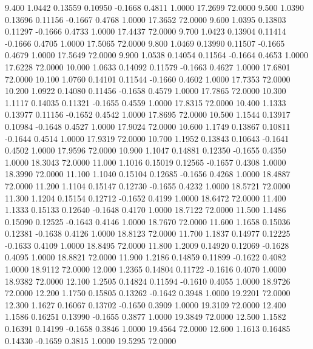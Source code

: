    9.400   1.0442   0.13559   0.10950  -0.1668   0.4811   1.0000  17.2699  72.0000
   9.500   1.0390   0.13696   0.11156  -0.1667   0.4768   1.0000  17.3652  72.0000
   9.600   1.0395   0.13803   0.11297  -0.1666   0.4733   1.0000  17.4437  72.0000
   9.700   1.0423   0.13904   0.11414  -0.1666   0.4705   1.0000  17.5065  72.0000
   9.800   1.0469   0.13990   0.11507  -0.1665   0.4679   1.0000  17.5649  72.0000
   9.900   1.0538   0.14054   0.11564  -0.1664   0.4653   1.0000  17.6228  72.0000
  10.000   1.0633   0.14092   0.11579  -0.1663   0.4627   1.0000  17.6801  72.0000
  10.100   1.0760   0.14101   0.11544  -0.1660   0.4602   1.0000  17.7353  72.0000
  10.200   1.0922   0.14080   0.11456  -0.1658   0.4579   1.0000  17.7865  72.0000
  10.300   1.1117   0.14035   0.11321  -0.1655   0.4559   1.0000  17.8315  72.0000
  10.400   1.1333   0.13977   0.11156  -0.1652   0.4542   1.0000  17.8695  72.0000
  10.500   1.1544   0.13917   0.10984  -0.1648   0.4527   1.0000  17.9024  72.0000
  10.600   1.1749   0.13867   0.10811  -0.1644   0.4514   1.0000  17.9319  72.0000
  10.700   1.1952   0.13843   0.10643  -0.1641   0.4502   1.0000  17.9596  72.0000
  10.900   1.1047   0.14881   0.12350  -0.1655   0.4350   1.0000  18.3043  72.0000
  11.000   1.1016   0.15019   0.12565  -0.1657   0.4308   1.0000  18.3990  72.0000
  11.100   1.1040   0.15104   0.12685  -0.1656   0.4268   1.0000  18.4887  72.0000
  11.200   1.1104   0.15147   0.12730  -0.1655   0.4232   1.0000  18.5721  72.0000
  11.300   1.1204   0.15154   0.12712  -0.1652   0.4199   1.0000  18.6472  72.0000
  11.400   1.1333   0.15133   0.12640  -0.1648   0.4170   1.0000  18.7122  72.0000
  11.500   1.1486   0.15090   0.12525  -0.1643   0.4146   1.0000  18.7670  72.0000
  11.600   1.1658   0.15036   0.12381  -0.1638   0.4126   1.0000  18.8123  72.0000
  11.700   1.1837   0.14977   0.12225  -0.1633   0.4109   1.0000  18.8495  72.0000
  11.800   1.2009   0.14920   0.12069  -0.1628   0.4095   1.0000  18.8821  72.0000
  11.900   1.2186   0.14859   0.11899  -0.1622   0.4082   1.0000  18.9112  72.0000
  12.000   1.2365   0.14804   0.11722  -0.1616   0.4070   1.0000  18.9382  72.0000
  12.100   1.2505   0.14824   0.11594  -0.1610   0.4055   1.0000  18.9726  72.0000
  12.200   1.1750   0.15805   0.13262  -0.1642   0.3948   1.0000  19.2201  72.0000
  12.300   1.1627   0.16067   0.13702  -0.1650   0.3909   1.0000  19.3109  72.0000
  12.400   1.1586   0.16251   0.13990  -0.1655   0.3877   1.0000  19.3849  72.0000
  12.500   1.1582   0.16391   0.14199  -0.1658   0.3846   1.0000  19.4564  72.0000
  12.600   1.1613   0.16485   0.14330  -0.1659   0.3815   1.0000  19.5295  72.0000
